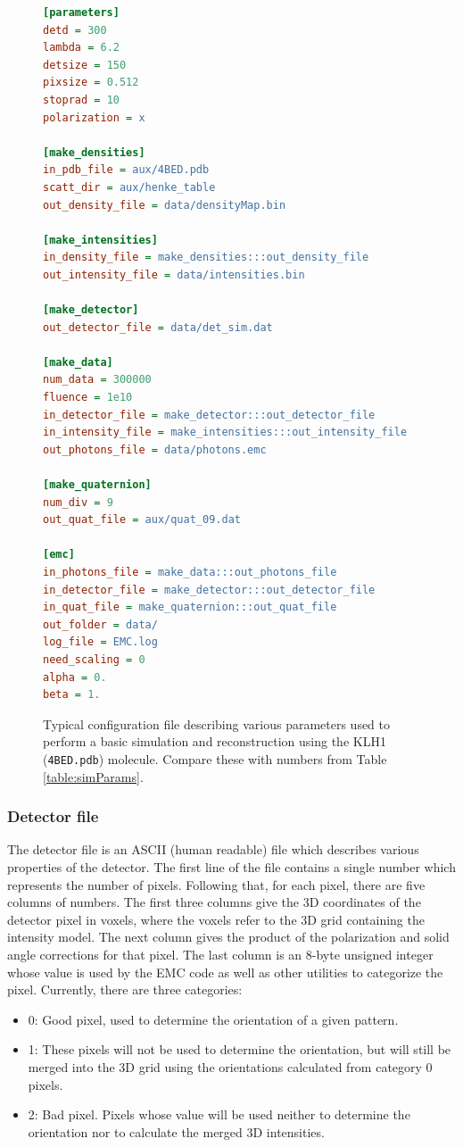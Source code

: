 \documentclass[preprint]{iucr}              %
\begin{document}
\begin{figure}
\begin{lstlisting}[language=ini]
[parameters]
detd = 300
lambda = 6.2
detsize = 150
pixsize = 0.512
stoprad = 10
polarization = x

[make_densities]
in_pdb_file = aux/4BED.pdb
scatt_dir = aux/henke_table
out_density_file = data/densityMap.bin

[make_intensities]
in_density_file = make_densities:::out_density_file
out_intensity_file = data/intensities.bin

[make_detector]
out_detector_file = data/det_sim.dat

[make_data]
num_data = 300000
fluence = 1e10
in_detector_file = make_detector:::out_detector_file
in_intensity_file = make_intensities:::out_intensity_file
out_photons_file = data/photons.emc

[make_quaternion]
num_div = 9
out_quat_file = aux/quat_09.dat

[emc]
in_photons_file = make_data:::out_photons_file
in_detector_file = make_detector:::out_detector_file
in_quat_file = make_quaternion:::out_quat_file
out_folder = data/
log_file = EMC.log
need_scaling = 0
alpha = 0.
beta = 1.
\end{lstlisting}
\caption{Typical configuration file describing various parameters used to perform a basic simulation and reconstruction using the KLH1 (\texttt{4BED.pdb}) molecule. Compare these with numbers from Table \ref{table:simParams}.}
\label{fig:config}
\end{figure}

\subsubsection{Detector file}\label{subsubsec:detector}
The detector file is an ASCII (human readable) file which describes various properties of the detector. The first line of the file contains a single number which represents the number of pixels. Following that, for each pixel, there are five columns of numbers. The first three columns give the 3D coordinates of the detector pixel in voxels, where the voxels refer to the 3D grid containing the intensity model. The next column gives the product of the polarization and solid angle corrections for that pixel. The last column is an 8-byte unsigned integer whose value is used by the EMC code as well as other utilities to categorize the pixel. Currently, there are three categories:
\begin{itemize}
\item 0: Good pixel, used to determine the orientation of a given pattern.
\item 1: These pixels will not be used to determine the orientation, but will still be merged into the 3D grid using the orientations calculated from category 0 pixels.
\item 2: Bad pixel. Pixels whose value will be used neither to determine the orientation nor to calculate the merged 3D intensities.
\end{itemize}
\end{document}
